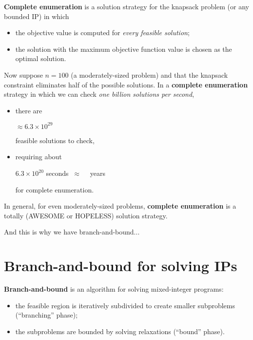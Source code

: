 \documentclass[11pt]{article}
\theoremstyle{definition}
\newcommand{\answerbox}[3]{%
  \fbox{%
    \begin{minipage}[#1]{#2}
      \hfill\vspace{#3}
    \end{minipage}
  }
}
\newcommand{\wordbox}{\answerbox{c}{1.2in}{.7cm}}
\newcommand{\catbox}{\answerbox{c}{.5in}{.7cm}}
\begin{document}
\newpage

\begin{tcolorbox}
\textbf{Complete enumeration} is a solution strategy for the knapsack problem (or any bounded IP) in which 
\begin{itemize}
\item the objective value is computed for \emph{every feasible solution};
\item the solution with the maximum objective function value is chosen as the optimal solution.
\end{itemize}
\end{tcolorbox}

Now suppose $n = 100$ (a moderately-sized problem) and that the knapsack constraint eliminates half of the possible solutions.  In a \textbf{complete enumeration} strategy in which we can check \emph{one billion solutions per second},

\begin{itemize}
\item there are 
\begin{center}
\catbox $\approx 6.3 \times 10^{29}$
\end{center}
feasible solutions to check,
\item requiring about 

\begin{center}
$6.3 \times 10^{20}$ seconds $~\approx~~$ \wordbox ~years
\end{center}
for complete enumeration.
\end{itemize}

\begin{tcolorbox}
In general, for even moderately-sized problems, \textbf{complete enumeration} is a totally (AWESOME or HOPELESS) solution strategy.
\end{tcolorbox}

And this is why we have branch-and-bound...

\vfill
\section{Branch-and-bound for solving IPs}

\begin{tcolorbox}
\textbf{Branch-and-bound} is an algorithm for solving mixed-integer programs: 
\begin{itemize}
\item the feasible region is iteratively subdivided to create smaller subproblems  (``branching'' phase);
\item the subproblems are bounded by solving relaxations  (``bound'' phase).
\end{itemize}
\end{tcolorbox}
\end{document}
